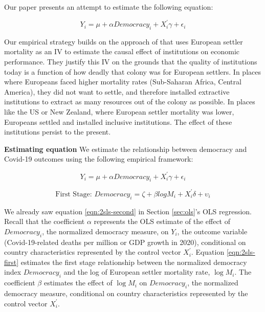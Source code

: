 Our paper presents an attempt to estimate the following equation: 

\begin{equation}\tag{1}
    \label{eqn:2sls-second}
    Y_i = \mu + \alpha Democracy_i + X^{'}_i \gamma + \epsilon_i
\end{equation}


Our empirical strategy builds on the approach of \citet{ajr} that uses European settler mortality as an IV to estimate the causal effect of institutions on economic performance. 
They justify this IV on the grounds that the quality of institutions today is a function of how deadly that colony was for European settlers. In places where Europeans faced higher mortality rates (Sub-Saharan Africa, Central America), they did not want to settle, and therefore installed extractive institutions to extract as many resources out of the colony as possible. In places like the US or New Zealand, where European settler mortality was lower, Europeans settled and installed inclusive institutions. The effect of these institutions persist to the present. 


\noindent \textbf{Estimating equation} We estimate the relationship between democracy and Covid-19 outcomes using the following empirical framework: 

\begin{equation}\tag{1}
    \label{eqn:2sls-second}
    Y_i = \mu + \alpha Democracy_i + X^{'}_i \gamma + \epsilon_i
\end{equation}

\begin{equation}
    \label{eqn:2sls-first}
    \text{First Stage: } 
    Democracy_i = \zeta + \beta log M_i + X^{'}_i \delta + \upsilon_i
\end{equation}

\noindent We already saw equation \ref{eqn:2sls-second} in Section \ref{sec:ols}'s OLS regression. Recall that the coefficient $\alpha$ represents the OLS estimate of the effect of $Democracy_i$, the normalized democracy measure, on $Y_i$, the outcome variable (Covid-19-related deaths per million or GDP growth in 2020), conditional on country characteristics represented by the control vector $X^{'}_i$. Equation \ref{eqn:2sls-first} estimates the first stage relationship between the normalized democracy index $Democracy_i$ and the log of European settler mortality rate, $\log{M_i}$. The coefficient $\beta$ estimates the effect of $\log{M_i}$ on $Democracy_i$, the normalized democracy measure, conditional on country characteristics represented by the control vector $X^{'}_i$. 

